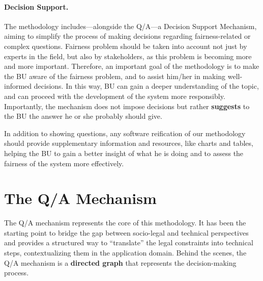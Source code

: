 \documentclass[12pt,a4paper,openright,twoside]{book}
\begin{document}
\paragraph{Decision Support.}
The methodology includes---alongside the \ac{Q/A}---a Decision Support Mechanism, aiming to simplify the process of making decisions regarding fairness-related or complex questions.
%
Fairness problem should be taken into account not just by experts in the field, but also by stakeholders, as this problem is becoming more and more important.
%
Therefore, an important goal of the methodology is to make the \ac{BU} aware of the fairness problem, and to assist him/her in making well-informed decisions.
%
In this way, \ac{BU} can gain a deeper understanding of the topic, and can proceed with the development of the system more responsibly.
%
Importantly, the mechanism does not impose decisions but rather \textbf{suggests} to the \ac{BU} the answer he or she probably should give.

In addition to showing questions, any software reification of our methodology should provide supplementary information and resources, like charts and tables, helping the \ac{BU} to gain a better insight of what he is doing and to assess the fairness of the system more effectively.


\section{The \acs{Q/A} Mechanism}\label{sec:qa-mechanism}

The \acf{Q/A} mechanism represents the core of this methodology.
%
It has been the starting point to bridge the gap between socio-legal and technical perspectives and provides a structured way to ``translate'' the legal constraints into technical steps, contextualizing them in the application domain.
%
Behind the scenes, the \ac{Q/A} mechanism is a \textbf{directed graph} that represents the decision-making process.
\end{document}
